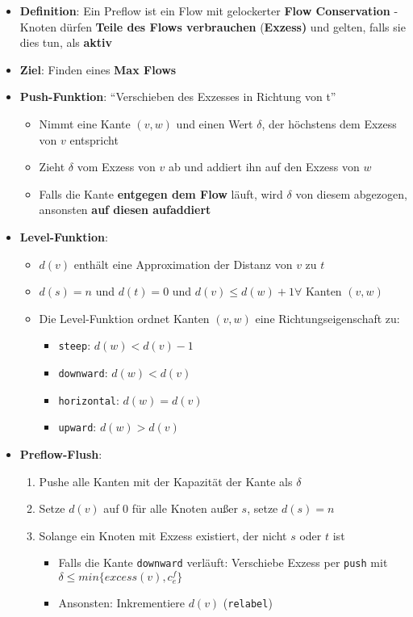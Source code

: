 \documentclass[10pt,a4paper]{article}
\newcommand{\quotestyle}[1]{\enquote{#1}}
\begin{document}
	\begin{itemize}
		\item \textbf{Definition}: Ein Preflow ist ein Flow mit gelockerter \textbf{Flow Conservation} - Knoten dürfen \textbf{Teile des Flows verbrauchen} (\textbf{Exzess)} und gelten, falls sie dies tun, als \textbf{aktiv}
		\item \textbf{Ziel}: Finden eines \textbf{Max Flows}
		\item \textbf{Push-Funktion}: \quotestyle{Verschieben des Exzesses in Richtung von t}
		\begin{itemize}
			\item Nimmt eine Kante $(v,w)$ und einen Wert $\delta$, der höchstens dem Exzess von $v$ entspricht
			\item Zieht $\delta$ vom Exzess von $v$ ab und addiert ihn auf den Exzess von $w$
			\item Falls die Kante \textbf{entgegen dem Flow} läuft, wird $\delta$ von diesem abgezogen, ansonsten \textbf{auf diesen aufaddiert}
		\end{itemize}
		\item \textbf{Level-Funktion}:
		\begin{itemize}
			\item $d(v)$ enthält eine Approximation der Distanz von $v$ zu $t$
			\item $d(s) = n$ und $d(t) = 0$ und $d(v) \leq d(w) + 1 \forall$ Kanten $(v,w)$
			\item Die Level-Funktion ordnet Kanten $(v,w)$ eine Richtungseigenschaft zu:
			\begin{itemize}
				\item \texttt{steep}: $d(w) < d(v) - 1$
				\item \texttt{downward}: $d(w) < d(v)$
				\item \texttt{horizontal}: $d(w) = d(v)$
				\item \texttt{upward}: $d(w) > d(v)$
			\end{itemize}
		\end{itemize}
		\item \textbf{Preflow-Flush}:
		\begin{enumerate}
			\item Pushe alle Kanten mit der Kapazität der Kante als $\delta$
			\item Setze $d(v)$ auf $0$ für alle Knoten außer $s$, setze $d(s) = n$
			\item Solange ein Knoten mit Exzess existiert, der nicht $s$ oder $t$ ist
			\begin{itemize}
				\item Falls die Kante \texttt{downward} verläuft: Verschiebe Exzess per \texttt{push} mit $\delta \leq min\{excess(v), c_e^f\}$
				\item Ansonsten: Inkrementiere $d(v)$ (\texttt{relabel})
			\end{itemize}
		\end{enumerate}
	\end{itemize}
\end{document}
